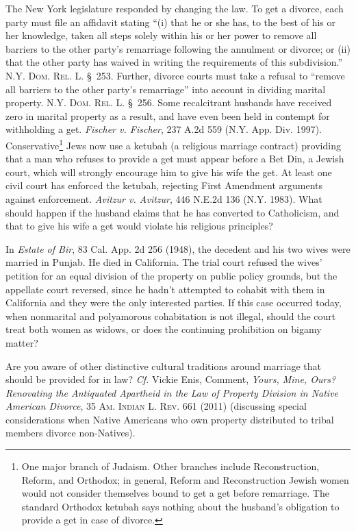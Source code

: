 The New York legislature responded by changing the law. To get a divorce, each
party must file an affidavit stating ``(i) that he or she has, to the best of
his or her knowledge, taken all steps solely within his or her power to remove
all barriers to the other party's remarriage following the annulment or divorce;
or (ii) that the other party has waived in writing the requirements of this
subdivision.'' \textsc{N.Y. Dom. Rel. L.} \S~253. Further, divorce courts must
take a refusal to ``remove all barriers to the other party's remarriage'' into
account in dividing marital property. \textsc{N.Y. Dom. Rel. L.} \S~256. Some
recalcitrant husbands have received zero in marital property as a result, and
have even been held in contempt for withholding a get. \emph{Fischer v.
Fischer}, 237 A.2d 559 (N.Y. App. Div. 1997). Conservative\footnote{One major
branch of Judaism. Other branches include Reconstruction, Reform, and Orthodox;
in general, Reform and Reconstruction Jewish women would not consider themselves
bound to get a get before remarriage. The standard Orthodox ketubah says
nothing about the husband's obligation to provide a get in case of divorce.}
Jews now use a ketubah (a religious marriage contract) providing that a man who
refuses to provide a get must appear before a Bet Din, a Jewish court, which
will strongly encourage him to give his wife the get. At least one civil court
has enforced the ketubah, rejecting First Amendment arguments against
enforcement. \emph{Avitzur v. Avitzur}, 446 N.E.2d 136 (N.Y. 1983). What should
happen if the husband claims that he has converted to Catholicism, and that to
give his wife a get would violate his religious principles?

In \emph{Estate of Bir}, 83 Cal. App. 2d 256 (1948), the decedent and his two
wives were married in Punjab. He died in California. The trial court refused the
wives' petition for an equal division of the property on public policy grounds,
but the appellate court reversed, since he hadn't attempted to cohabit with
them in California and they were the only interested parties. If this case
occurred today, when nonmarital and polyamorous cohabitation is not illegal,
should the court treat both women as widows, or does the continuing prohibition
on bigamy matter?

Are you aware of other distinctive cultural traditions around marriage that
should be provided for in law? \textit{Cf.} Vickie Enis, Comment, \emph{Yours,
Mine, Ours? Renovating the Antiquated Apartheid in the Law of Property Division
in Native American Divorce}, 35 \textsc{Am. Indian L. Rev.} 661 (2011)
(discussing special considerations when Native Americans who own property
distributed to tribal members divorce non-Natives).

